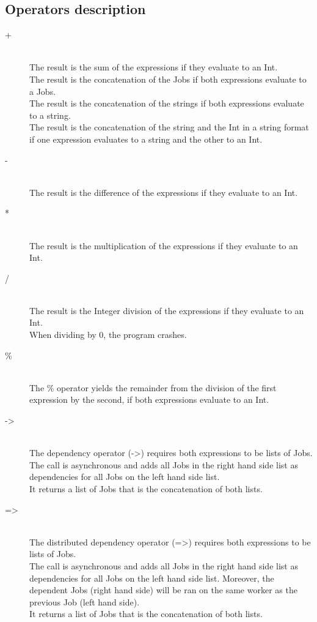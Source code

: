 \documentclass[12pt]{article}
\begin{document}
\subsection{Operators description}
\begin{description}
\item[+] \hfil \\
The result is the sum of the expressions if they evaluate to an Int.\\
The result is the concatenation of the Jobs if both expressions evaluate to
a Jobs.\\
The result is the concatenation of the strings if both expressions evaluate to
a string.\\
The result is the concatenation of the string and the Int in a string format if
one expression evaluates to a string and the other to an Int.\\

\item[-] \hfil \\
The result is the difference of the expressions if they evaluate to an Int.

\item[*] \hfil \\
The result is the multiplication of the expressions if they evaluate to an Int.

\item[/] \hfil \\
The result is the Integer division of the expressions if they evaluate to an Int.\\
When dividing by 0, the program crashes.

\item[\%] \hfil \\
The \% operator yields the remainder from the division of the first expression by the second, if
both expressions evaluate to an Int.

\item[->] \hfil \\
The dependency operator (->) requires both expressions to be lists of Jobs.\\
The call is asynchronous and adds all Jobs in the right hand side list as dependencies
for all Jobs on the left hand side list.\\
It returns a list of Jobs that is the concatenation of both lists.

\item[=>] \hfil \\
The distributed dependency operator (=>) requires both expressions to be lists of Jobs.\\
The call is asynchronous and adds all Jobs in the right hand side list as dependencies
for all Jobs on the left hand side list. Moreover, the dependent Jobs (right
hand side)  will be ran on the same worker as the previous Job (left hand
side).\\
It returns a list of Jobs that is the concatenation of both lists.


\end{description}
\end{document}
